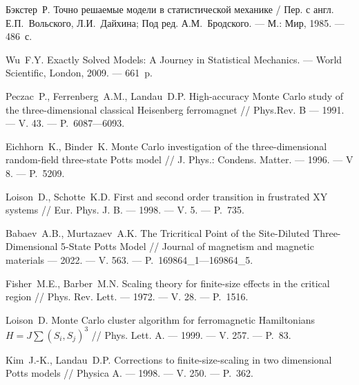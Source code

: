 \begin{thebibliography}{11}
Бэкстер~Р. 
Точно решаемые модели в статистической механике / Пер. с англ. Е.П.~Вольского, Л.И.~Дайхина; Под ред. А.М.~Бродского. 
--- М.: Мир, 1985. 
--- 486~с.





Wu~F.Y. 
Exactly Solved Models: A Journey in Statistical Mechanics. 
--- World Scientific, London, 2009. 
--- 661~p.





Peczac~P., Ferrenberg~A.M., Landau~D.P. 
High-accuracy Monte Carlo study of the three-dimensional classical Heisenberg ferromagnet // Phys.Rev. B 
--- 1991. 
--- V. 43. 
--- P.~6087---6093.





Eichhorn~K., Binder~K. 
Monte Carlo investigation of the three-dimensional random-field three-state Potts model 
// 
J. Phys.: Condens. Matter.
--- 1996. 
--- V 8. 
--- P.~5209.





Loison~D., Schotte~K.D. 
First and second order transition in frustrated XY systems 
// 
Eur. Phys. J. B. 
--- 1998. 
--- V. 5. 
--- P.~735.





Babaev~A.B., Murtazaev~A.K. 
The Tricritical Point of the Site-Diluted Three-Dimensional 5-State Potts Model // Journal of magnetism and magnetic materials 
--- 2022. 
--- V. 563. 
--- P.~169864\_1---169864\_5.





Fisher~M.E., Barber~M.N. 
Scaling theory for finite-size effects in the critical region 
// 
Phys. Rev. Lett. 
--- 1972. 
--- V. 28. 
--- P.~1516.





Loison~D. 
Monte Carlo cluster algorithm for ferromagnetic Hamiltonians $H = J\sum(S_i, S_j)^3$ 
// 
Phys. Lett. A. 
--- 1999. 
--- V. 257. 
--- P.~83.





Kim~J.-K., Landau~D.P. 
Corrections to finite-size-scaling in two dimensional Potts models 
// 
Physica A. 
--- 1998. 
--- V. 250. 
--- P.~362.


\end{thebibliography} 